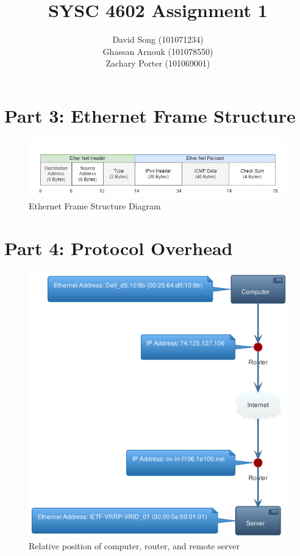 \documentclass{article}
\begin{document}
    \title  { \textbf{SYSC 4602 Assignment 1} }
    \author {
        David Song (101071234)\\
        Ghassan Arnouk (101078550)\\
        Zachary Porter (101069001)
    }

    \maketitle

    \clearpage
    \section*{Part 3: Ethernet Frame Structure}
    \begin{figure}[htbp]
        \centering
        \includegraphics[width=\textwidth]{images/assignment3-part3.drawio.png}
        \caption{Ethernet Frame Structure Diagram}
    \end{figure}
    \clearpage
    \section*{Part 4: Protocol Overhead}
    \begin{figure}[htbp]
        \centering
        \includegraphics[width=\textwidth]{images/assignment3-part4.plantuml.png}
        \caption{Relative position of computer, router, and remote server}
    \end{figure}
\end{document}
